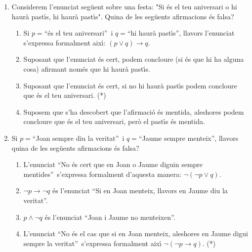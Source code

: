 

\begin{enumerate}
\item Considerem l'enunciat seg\"{u}ent sobre una festa: "Si \'{e}s el teu
aniversari o hi haur\`{a} past\'{\i}s, hi haur\`{a} past\'{\i}s". Quina de les
seg\"{u}ents afirmacions \'{e}s falsa?

\begin{enumerate}
\item Si $p=$\textquotedblleft\'{e}s el teu aniversari\textquotedblright\ i
$q=$\textquotedblleft hi haur\`{a} past\'{\i}s\textquotedblright, llavors
l'enunciat s'expressa formalment aix\'{\i}: $\left(  p\vee q\right)
\longrightarrow q$.

\item Suposant que l'enunciat \'{e}s cert, podem concloure (si \'{e}s que hi
ha alguna cosa) afirmant nom\'{e}s que hi haur\`{a} past\'{\i}s.

\item Suposant que l'enunciat \'{e}s cert, si no hi haur\`{a} past\'{\i}s
podem concloure que \'{e}s el teu aniversari. (*)

\item Suposem que s'ha descobert que l'afirmaci\'{o} \'{e}s mentida, aleshores
podem concloure que \'{e}s el teu aniversari, per\`{o} el past\'{\i}s \'{e}s mentida.
\end{enumerate}

\item Si $p=$\textquotedblleft Joan sempre diu la veritat\textquotedblright\ i
$q=$\textquotedblleft Jaume sempre menteix\textquotedblright, llavors quina de
les seg\"{u}ents afirmacions \'{e}s falsa?

\begin{enumerate}
\item L'enunciat \textquotedblleft No \'{e}s cert que en Joan o Jaume diguin
sempre mentides\textquotedblright\ s'expressa formalment d'aquesta manera:
$\lnot\left(  \lnot p\vee q\right)  $.

\item $\lnot p\longrightarrow\lnot q$ \'{e}s l'enunciat \textquotedblleft Si
en Joan menteix, llavors en Jaume diu la veritat\textquotedblright.

\item $p\wedge\lnot q$ \'{e}s l'enunciat \textquotedblleft Joan i Jaume no
menteixen\textquotedblright.

\item L'enunciat \textquotedblleft No \'{e}s el cas que si en Joan menteix,
aleshores en Jaume digui sempre la veritat\textquotedblright\ s'expressa
formalment aix\'{\i} $\lnot\left(  \lnot p\longrightarrow q\right)  $. (*)
\end{enumerate}


\end{enumerate}
